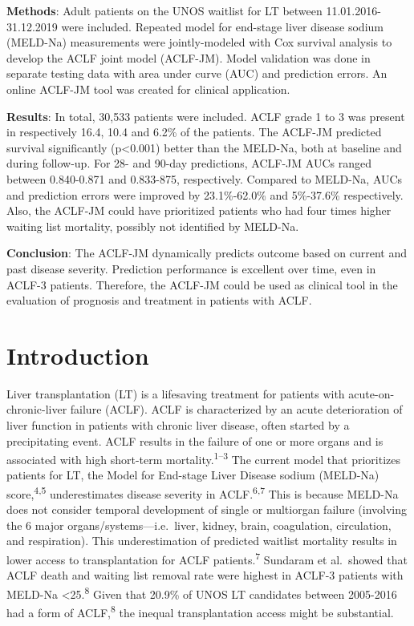 \documentclass[11pt,english,]{book} %
\begin{document}
\textbf{Methods}: Adult patients on the UNOS waitlist for LT between 11.01.2016-31.12.2019 were included. Repeated model for end-stage liver disease sodium (MELD-Na) measurements were jointly-modeled with Cox survival analysis to develop the ACLF joint model (ACLF-JM). Model validation was done in separate testing data with area under curve (AUC) and prediction errors. An online ACLF-JM tool was created for clinical application.

\textbf{Results}: In total, 30,533 patients were included. ACLF grade 1 to 3 was present in respectively 16.4, 10.4 and 6.2\% of the patients. The ACLF-JM predicted survival significantly (p\textless0.001) better than the MELD-Na, both at baseline and during follow-up. For 28- and 90-day predictions, ACLF-JM AUCs ranged between 0.840-0.871 and 0.833-875, respectively. Compared to MELD-Na, AUCs and prediction errors were improved by 23.1\%-62.0\% and 5\%-37.6\% respectively. Also, the ACLF-JM could have prioritized patients who had four times higher waiting list mortality, possibly not identified by MELD-Na.

\textbf{Conclusion}: The ACLF-JM dynamically predicts outcome based on current and past disease severity. Prediction performance is excellent over time, even in ACLF-3 patients. Therefore, the ACLF-JM could be used as clinical tool in the evaluation of prognosis and treatment in patients with ACLF.

\newpage
\normalsize

\hypertarget{introduction-3}{%
\section*{Introduction}\label{introduction-3}}

Liver transplantation (LT) is a lifesaving treatment for patients with acute-on-chronic-liver failure (ACLF). ACLF is characterized by an acute deterioration of liver function in patients with chronic liver disease, often started by a precipitating event. ACLF results in the failure of one or more organs and is associated with high short-term mortality.\textsuperscript{1--3} The current model that prioritizes patients for LT, the Model for End-stage Liver Disease sodium (MELD-Na) score,\textsuperscript{4,5} underestimates disease severity in ACLF.\textsuperscript{6,7} This is because MELD-Na does not consider temporal development of single or multiorgan failure (involving the 6 major organs/systems---i.e.~liver, kidney, brain, coagulation, circulation, and respiration). This underestimation of predicted waitlist mortality results in lower access to transplantation for ACLF patients.\textsuperscript{7} Sundaram et al.~showed that ACLF death and waiting list removal rate were highest in ACLF-3 patients with MELD-Na \textless25.\textsuperscript{8} Given that 20.9\% of UNOS LT candidates between 2005-2016 had a form of ACLF,\textsuperscript{8} the inequal transplantation access might be substantial.
\end{document}

